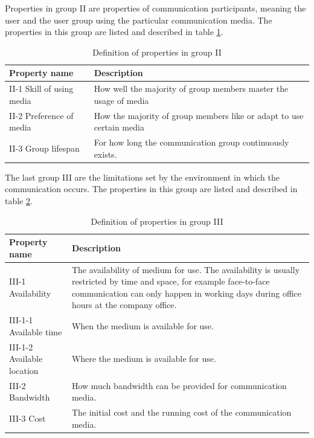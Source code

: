 \documentclass[english,12pt,a4paper,pdftex]{article}
\begin{document}
Properties in group II are properties of communication participants, meaning the user and the user group using the particular communication media. The properties in this group are listed and described in table \ref{table:mft_group2}.

\begin{table}[!h]
\renewcommand{\arraystretch}{1.3}
\caption{Definition of properties in group II}
\label{table:mft_group2}
\centering
\begin{tabular}{|p{4cm}|p{10cm}|}
\hline
\textbf{Property name} & \textbf{Description}\\
\hline
II-1 Skill of using media & How well the majority of group members master the usage of media  \\
\hline
II-2 Preference of media & How the majority of group members like or adapt to use certain media \\
\hline
II-3 Group lifespan & For how long the communication group continuously exists. \\
\hline
\end{tabular}
\end{table}

The last group III are the limitations set by the environment in which the communication occurs. The properties in this group are listed and described in table \ref{table:mft_group3}.

\begin{table}[!h]
\renewcommand{\arraystretch}{1.3}
\caption{Definition of properties in group III}
\label{table:mft_group3}
\centering
\begin{tabular}{|p{4cm}|p{10cm}|}
\hline
\textbf{Property name} & \textbf{Description}\\
\hline
III-1 Availability & The availability of medium for use. The availability is usually restricted by time and space, for example face-to-face communication can only happen in working days during office hours at the company office. \\
\hline
III-1-1 Available time & When the medium is available for use. \\
\hline
III-1-2 Available location & Where the medium is available for use. \\
\hline
III-2 Bandwidth & How much bandwidth can be provided for communication media. \\
\hline
III-3 Cost & The initial cost and the running cost of the communication media. \\
\hline
\end{tabular}
\end{table}
\end{document}
